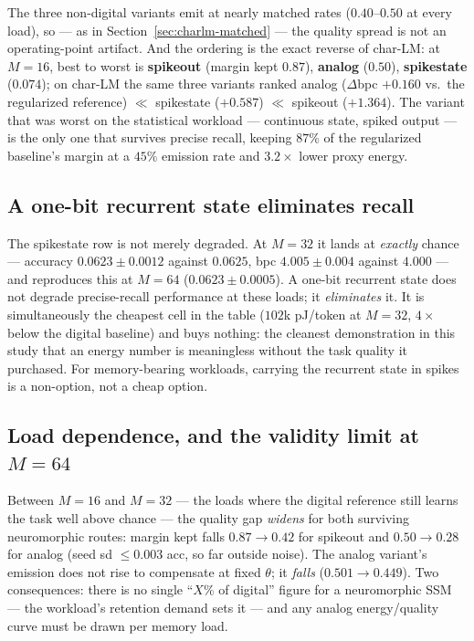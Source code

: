 The three non-digital variants emit at nearly matched rates ($0.40$--$0.50$ at every load), so
--- as in Section~\ref{sec:charlm-matched} --- the quality spread is not an operating-point
artifact. And the ordering is the exact reverse of char-LM: at $M{=}16$, best to worst is
\textbf{spikeout} (margin kept $0.87$), \textbf{analog} ($0.50$), \textbf{spikestate}
($0.074$); on char-LM the same three variants ranked analog ($\Delta$bpc $+0.160$ vs.\ the
regularized reference) $\ll$ spikestate ($+0.587$) $\ll$ spikeout ($+1.364$). The variant
that was worst on the statistical workload --- continuous state, spiked output --- is the
only one that survives precise recall, keeping $87\%$ of the regularized baseline's margin at
a $45\%$ emission rate and $3.2\times$ lower proxy energy.

\subsection{A one-bit recurrent state eliminates recall}
\label{sec:copy-floor}

The spikestate row is not merely degraded. At $M{=}32$ it lands at \emph{exactly} chance ---
accuracy $0.0623 \pm 0.0012$ against $0.0625$, bpc $4.005 \pm 0.004$ against $4.000$ --- and
reproduces this at $M{=}64$ ($0.0623 \pm 0.0005$). A one-bit recurrent state does not degrade
precise-recall performance at these loads; it \emph{eliminates} it. It is simultaneously the
cheapest cell in the table ($102$k pJ/token at $M{=}32$, $4\times$ below the digital
baseline) and buys nothing: the cleanest demonstration in this study that an energy number is
meaningless without the task quality it purchased. For memory-bearing workloads, carrying the
recurrent state in spikes is a non-option, not a cheap option.

\subsection{Load dependence, and the validity limit at $M{=}64$}
\label{sec:copy-load}

Between $M{=}16$ and $M{=}32$ --- the loads where the digital reference still learns the task
well above chance --- the quality gap \emph{widens} for both surviving neuromorphic routes:
margin kept falls $0.87 \rightarrow 0.42$ for spikeout and $0.50 \rightarrow 0.28$ for analog
(seed sd $\le 0.003$ acc, so far outside noise). The analog variant's emission does not rise
to compensate at fixed $\theta$; it \emph{falls} ($0.501 \rightarrow 0.449$). Two
consequences: there is no single ``$X\%$ of digital'' figure for a neuromorphic SSM --- the
workload's retention demand sets it --- and any analog energy/quality curve must be drawn per
memory load.

